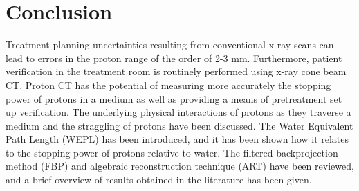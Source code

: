 \documentclass[11pt,a4paper]{article}
\begin{document}
\section{Conclusion}
Treatment planning uncertainties resulting from conventional x-ray scans can lead to errors in the proton range of the order of 2-3 mm. Furthermore, patient verification in the treatment room is routinely performed using x-ray cone beam CT. Proton CT has the potential of measuring more accurately the stopping power of protons in a medium as well as providing a means of pretreatment set up verification. The underlying physical interactions of protons as they traverse a medium and the straggling of protons have been discussed. The Water Equivalent Path Length (WEPL) has been introduced, and it has been shown how it relates to the stopping power of protons relative to water. The filtered backprojection method (FBP) and algebraic reconstruction technique (ART) have been reviewed, and a brief overview of results obtained in the literature has been given. 

{}
%


\end{document}
